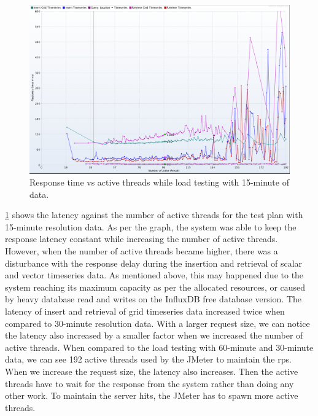 \begin{figure}[htp]
    \centering
    \includegraphics[width=1.0\textwidth]{results/obs/all/obs_all_15m_response_times_vs_threads.png}
    \caption{Response time vs active threads while load testing with 15-minute of data.}
    \label{fi:test_obs_all_15m_response_vs_threads}
\end{figure}

\cref{fi:test_obs_all_15m_response_vs_threads} shows the latency against the number of active threads for the test plan with 15-minute resolution data. As per the graph, the system was able to keep the response latency constant while increasing the number of active threads. However, when the number of active threads became higher, there was a disturbance with the response delay during the insertion and retrieval of scalar and vector timeseries data. As mentioned above, this may happened due to the system reaching its maximum capacity as per the allocated resources, or caused by heavy database read and writes on the InfluxDB free database version. The latency of insert and retrieval of grid timeseries data increased twice when compared to 30-minute resolution data. With a larger request size, we can notice the latency also increased by a smaller factor when we increased the number of active threads. When compared to the load testing with 60-minute and 30-minute data, we can see 192 active threads used by the JMeter to maintain the \acrshort{rps}. When we increase the request size, the latency also increases. Then the active threads have to wait for the response from the system rather than doing any other work. To maintain the server hits, the JMeter has to spawn more active threads.

